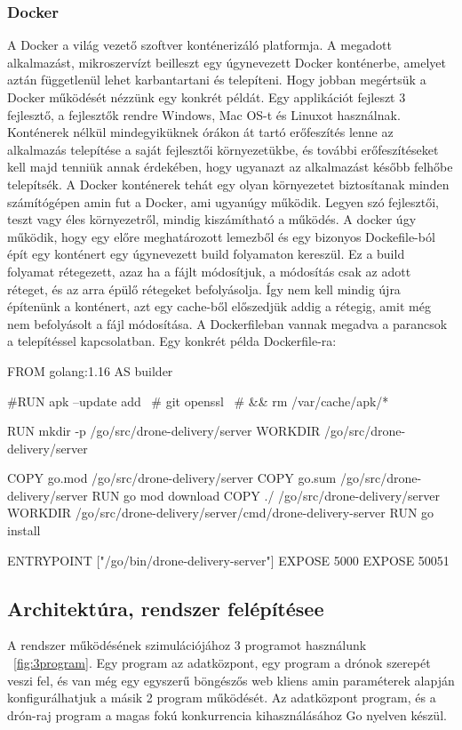\subsubsection{Docker}
A Docker a világ vezető szoftver konténerizáló platformja.
A megadott alkalmazást, mikroszervízt beilleszt egy úgynevezett Docker konténerbe, amelyet aztán függetlenül lehet karbantartani és telepíteni.
Hogy jobban megértsük a Docker működését nézzünk egy konkrét példát.
Egy applikációt fejleszt 3 fejlesztő, a fejlesztők rendre Windows, Mac OS-t és Linuxot használnak.
Konténerek nélkül mindegyiküknek órákon át tartó erőfeszítés lenne az alkalmazás telepítése a saját fejlesztői környezetükbe, és további erőfeszítéseket kell majd tenniük annak érdekében, hogy ugyanazt az alkalmazást később felhőbe telepítsék.
A Docker konténerek tehát egy olyan környezetet biztosítanak minden számítógépen amin fut a Docker, ami ugyanúgy működik.
Legyen szó fejlesztői, teszt vagy éles környezetről, mindig kiszámítható a működés.
A docker úgy működik, hogy egy előre meghatározott lemezből és egy bizonyos Dockefile-ból épít egy konténert egy úgynevezett build folyamaton kereszül.
Ez a build folyamat rétegezett, azaz ha a fájlt módosítjuk, a módosítás csak az adott réteget, és az arra épülő rétegeket befolyásolja.
Így nem kell mindig újra építenünk a konténert, azt egy cache-ből előszedjük addig a rétegig, amit még nem befolyásolt a fájl módosítása.
A Dockerfileban vannak megadva a parancsok a telepítéssel kapcsolatban.
Egy konkrét példa Dockerfile-ra:
\begin{docker}
    FROM golang:1.16 AS builder

    #RUN apk --update add \
    #	git openssl \
    #	&& rm /var/cache/apk/*

    RUN mkdir -p /go/src/drone-delivery/server
    WORKDIR /go/src/drone-delivery/server

    COPY go.mod /go/src/drone-delivery/server
    COPY go.sum /go/src/drone-delivery/server
    RUN go mod download
    COPY ./ /go/src/drone-delivery/server
    WORKDIR /go/src/drone-delivery/server/cmd/drone-delivery-server
    RUN go install

    ENTRYPOINT ["/go/bin/drone-delivery-server"]
    EXPOSE 5000
    EXPOSE 50051
\end{docker}


\subsection{Architektúra, rendszer felépítésee}\label{subsec:architektúra-program-felépítés}
A rendszer működésének szimulációjához 3 programot használunk ~\ref{fig:3program}.
Egy program az adatközpont, egy program a drónok szerepét veszi fel, és van még egy egyszerű böngészős web kliens amin paraméterek alapján konfigurálhatjuk a másik 2 program működését.
Az adatközpont program, és a drón-raj program a magas fokú konkurrencia kihasználásához Go nyelven készül.


